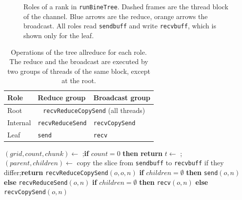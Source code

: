\begin{figure}[t]
{}
  \caption{Roles of a rank in \texttt{runBineTree}. Dashed frames are the thread block
           of the channel. Blue arrows are the reduce, orange arrows the broadcast.
           All roles read \texttt{sendbuff} and write \texttt{recvbuff}, which is
           shown only for the leaf.}
  \label{fig:tar-roles}
\end{figure}
\begin{table}[t]
\centering
\small
\caption{Operations of the \bine{} tree allreduce for each role. The reduce and the broadcast are executed by two groups of threads of the same block, except at the root.}
\label{tab:tar-calls}
\begin{tabular}{@{}lll@{}}
\toprule
Role & Reduce group & Broadcast group \\
\midrule
Root     & \multicolumn{2}{c}{\texttt{recvReduceCopySend} (all threads)} \\
Internal & \texttt{recvReduceSend} & \texttt{recvCopySend} \\
Leaf     & \texttt{send}           & \texttt{recv} \\
\bottomrule
\end{tabular}
\end{table}
\begin{algorithm}[t]
\caption{\bine{} tree allreduce (\texttt{runBineTree}, one block per channel).}
\label{alg:tar}
\begin{algorithmic}[1]
\State $(\mathit{grid},\mathit{count},\mathit{chunk}) \gets$ ;\quad \textbf{if} $\mathit{count}=0$ \textbf{then return}
\State $t \gets$ ;\quad $(\mathit{parent},\mathit{children}) \gets$ 
  \State copy the slice from \texttt{sendbuff} to \texttt{recvbuff} if they differ;\quad \textbf{return}
\EndIf
{}
    \State \texttt{recvReduceCopySend}$(o,o,n)$
  \EndFor
{}
    \State \textbf{if} $\mathit{children}=\emptyset$ \textbf{then} \texttt{send}$(o,n)$ \textbf{else} \texttt{recvReduceSend}$(o,n)$
  \EndFor
\Else{}
    \State \textbf{if} $\mathit{children}=\emptyset$ \textbf{then} \texttt{recv}$(o,n)$ \textbf{else} \texttt{recvCopySend}$(o,n)$
  \EndFor
\EndIf
\end{algorithmic}
\end{algorithm}
